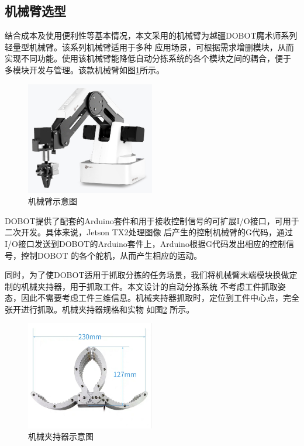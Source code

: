\subsection{机械臂选型}

结合成本及使用便利性等基本情况，本文采用的机械臂为越疆DOBOT魔术师系列轻量型机械臂。该系列机械臂适用于多种
应用场景，可根据需求增删模块，从而实现不同功能。使用该机械臂能降低自动分拣系统的各个模块之间的耦合，便于
多模块开发与管理。该款机械臂如图\ref{fig:robot}所示。

\begin{figure}[h]
    \centering
    \includegraphics[width=0.5\textwidth]{pic/chap2/robot.jpg}
    \caption{机械臂示意图}
    \label{fig:robot}
\end{figure}

DOBOT提供了配套的Arduino套件和用于接收控制信号的可扩展I/O接口，可用于二次开发。具体来说，Jetson TX2处理图像
后产生的控制机械臂的G代码，通过I/O接口发送到DOBOT的Arduino套件上，Arduino根据G代码发出相应的控制信号，控制DOBOT
的各个舵机，从而产生相应的运动。

同时，为了使DOBOT适用于抓取分拣的任务场景，我们将机械臂末端模块换做定制的机械夹持器，用于抓取工件。本文设计的自动分拣系统
不考虑工件抓取姿态，因此不需要考虑工件三维信息。机械夹持器抓取时，定位到工件中心点，完全张开进行抓取。机械夹持器规格和实物
如图\ref{fig:grip} 所示。

\begin{figure}[h]
    \centering
    \includegraphics[width=0.5\textwidth]{pic/chap2/grip.png}
    \caption{机械夹持器示意图}
    \label{fig:grip}
\end{figure}


